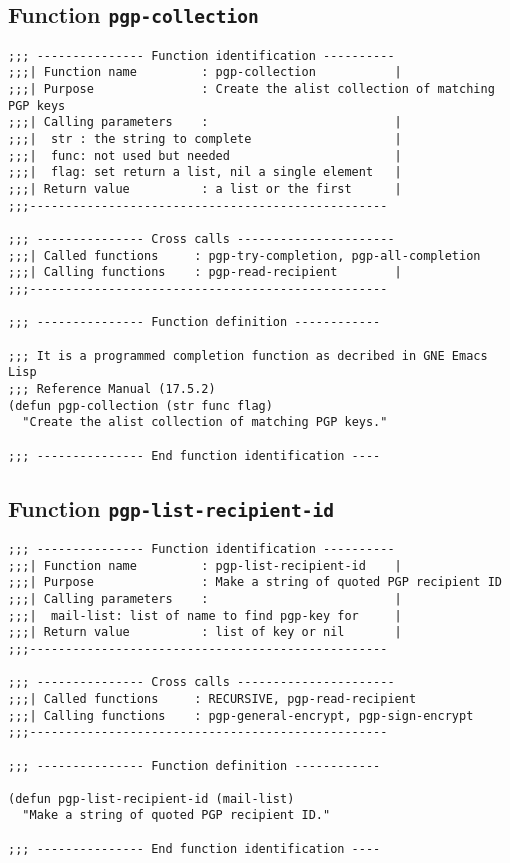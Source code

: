 \subsection{Function {\tt pgp-collection}}
\leavevmode
\begin{verbatim}
;;; --------------- Function identification ----------
;;;| Function name         : pgp-collection           |
;;;| Purpose               : Create the alist collection of matching PGP keys
;;;| Calling parameters    :                          |
;;;|  str : the string to complete                    |
;;;|  func: not used but needed                       |
;;;|  flag: set return a list, nil a single element   |
;;;| Return value          : a list or the first      |
;;;--------------------------------------------------

;;; --------------- Cross calls ----------------------
;;;| Called functions     : pgp-try-completion, pgp-all-completion
;;;| Calling functions    : pgp-read-recipient        |
;;;--------------------------------------------------

;;; --------------- Function definition ------------

;;; It is a programmed completion function as decribed in GNE Emacs Lisp
;;; Reference Manual (17.5.2)
(defun pgp-collection (str func flag)
  "Create the alist collection of matching PGP keys."

;;; --------------- End function identification ----
\end{verbatim}
\subsection{Function {\tt pgp-list-recipient-id}}
\leavevmode
\begin{verbatim}
;;; --------------- Function identification ----------
;;;| Function name         : pgp-list-recipient-id    |
;;;| Purpose               : Make a string of quoted PGP recipient ID
;;;| Calling parameters    :                          |
;;;|  mail-list: list of name to find pgp-key for     |
;;;| Return value          : list of key or nil       |
;;;--------------------------------------------------

;;; --------------- Cross calls ----------------------
;;;| Called functions     : RECURSIVE, pgp-read-recipient
;;;| Calling functions    : pgp-general-encrypt, pgp-sign-encrypt
;;;--------------------------------------------------

;;; --------------- Function definition ------------

(defun pgp-list-recipient-id (mail-list)
  "Make a string of quoted PGP recipient ID."

;;; --------------- End function identification ----
\end{verbatim}
